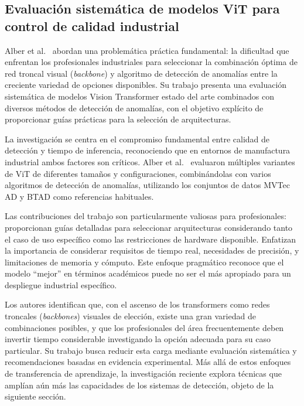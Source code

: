 \subsection{Evaluación sistemática de modelos ViT para control de calidad industrial}

Alber et al.~\cite{alber2024evaluating} abordan una problemática práctica fundamental: la dificultad que enfrentan los profesionales industriales para seleccionar la combinación óptima de red troncal visual (\textit{backbone}) y algoritmo de detección de anomalías entre la creciente variedad de opciones disponibles. Su trabajo presenta una evaluación sistemática de modelos Vision Transformer estado del arte combinados con diversos métodos de detección de anomalías, con el objetivo explícito de proporcionar guías prácticas para la selección de arquitecturas.

La investigación se centra en el compromiso fundamental entre calidad de detección y tiempo de inferencia, reconociendo que en entornos de manufactura industrial ambos factores son críticos. Alber et al.~\cite{alber2024evaluating} evaluaron múltiples variantes de ViT de diferentes tamaños y configuraciones, combinándolas con varios algoritmos de detección de anomalías, utilizando los conjuntos de datos MVTec AD y BTAD como referencias habituales.

Las contribuciones del trabajo son particularmente valiosas para profesionales: proporcionan guías detalladas para seleccionar arquitecturas considerando tanto el caso de uso específico como las restricciones de hardware disponible. Enfatizan la importancia de considerar requisitos de tiempo real, necesidades de precisión, y limitaciones de memoria y cómputo. Este enfoque pragmático reconoce que el modelo ``mejor'' en términos académicos puede no ser el más apropiado para un despliegue industrial específico.

Los autores identifican que, con el ascenso de los transformers como redes troncales (\textit{backbones}) visuales de elección, existe una gran variedad de combinaciones posibles, y que los profesionales del área frecuentemente deben invertir tiempo considerable investigando la opción adecuada para su caso particular. Su trabajo busca reducir esta carga mediante evaluación sistemática y recomendaciones basadas en evidencia experimental. Más allá de estos enfoques de transferencia de aprendizaje, la investigación reciente explora técnicas que amplían aún más las capacidades de los sistemas de detección, objeto de la siguiente sección.

